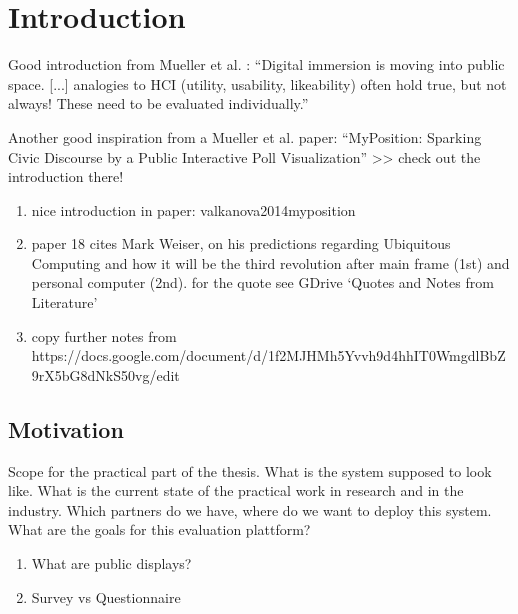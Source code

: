 \section{Introduction}
\label{sec:introduction}




  Good introduction from Mueller et al. \cite{muller2010requirements}: ``Digital immersion is moving into public space. [...] analogies to HCI (utility, usability, likeability) often hold true, but not always! These need to be evaluated individually.''

  Another good inspiration from a Mueller et al. paper: ``MyPosition: Sparking Civic Discourse by a Public Interactive Poll Visualization'' >> check out the introduction there!



\begin{enumerate}
\item nice introduction in paper: valkanova2014myposition
\item paper 18 cites Mark Weiser, on his predictions regarding Ubiquitous Computing and how it will be the third revolution after main frame (1st) and personal computer (2nd). for the quote see GDrive `Quotes and Notes from Literature'
\item copy further notes from https://docs.google.com/document/d/1f2MJHMh5Yvvh9d4hhIT0WmgdlBbZ9rX5bG8dNkS50vg/edit
\end{enumerate}



\subsection{Motivation}

Scope for the practical part of the thesis. What is the system supposed to look like. What is the current state of the practical work in research and in the industry. Which partners do we have, where do we want to deploy this system. What are the goals for this evaluation plattform?



  \begin{enumerate}
  \item What are public displays?
  \item Survey vs Questionnaire
  \end{enumerate}


